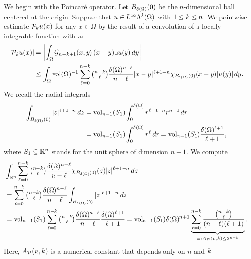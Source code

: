 \documentclass[10pt,a4paper]{article}
\begin{document}
We begin with the Poincar\'e operator. 
Let $B_{{\delta}(\Omega)}(0)$ be the $n$-dimensional ball centered at the origin.
Suppose that $u \in L^{\infty}\Lambda^{k}(\Omega)$ with $1 \leq k \leq n$.
We pointwise estimate ${\mathcal P}_{k} u(x)$ for any $x \in \Omega$ by the result of a convolution of a locally integrable function with $u$:
\begin{align*}
    \left| {\mathcal P}_{k} u(x) \right|
    &=
    \left| 
        \int_{\Omega} {\mathcal G}_{n-k+1}(x,y) \,(x-y)\lrcorner u(y)\,dy
    \right| 
    \\&\leq 
    \int_{\Omega} \operatorname{vol}(\Omega)^{-1} \sum_{\ell=0}^{ n-k }\tbinom{ n-k }{\ell} \frac{ {\delta}(\Omega)^{n-\ell} }{n-\ell} |x-y|^{\ell+1-n} \chi_{B_{{\delta}(\Omega)}(0)}(x-y) |u(y)| \,dy
    .
\end{align*}
We recall the radial integrals 
\begin{align*}
    \int_{B_{{\delta}(\Omega)}(0)} |z|^{\ell+1-n} \,dz
    &
    =
    \operatorname{vol}_{n-1}(S_1) \int_{0}^{{\delta}(\Omega)} r^{\ell+1-n} r^{n-1} \,dr
    \\&
    =
    \operatorname{vol}_{n-1}(S_1) \int_{0}^{{\delta}(\Omega)} r^{\ell} \,dr
    =
    \operatorname{vol}_{n-1}(S_1) \frac{{\delta}(\Omega)^{\ell+1}}{\ell+1}
    ,
\end{align*}
where $S_1 \subseteq {\mathbb R}^{n}$ stands for the unit sphere of dimension $n-1$. 
We compute 
\begin{align}
    &
    \int_{{\mathbb R}^{n}} \sum_{\ell=0}^{n-k} \tbinom{n-k}{\ell} \frac{ {\delta}(\Omega)^{n-\ell} }{n-\ell} \chi_{B_{{\delta}(\Omega)}(0)}(z) |z|^{\ell+1-n} \,dz
    \\&
    =
    \sum_{\ell=0}^{n-k} \tbinom{n-k}{\ell} \frac{ {\delta}(\Omega)^{n-\ell} }{n-\ell} \int_{B_{{\delta}(\Omega)}(0)} |z|^{\ell+1-n} \,dz
    \\&
    =
    \operatorname{vol}_{n-1}(S_1) \sum_{\ell=0}^{n-k} \tbinom{n-k}{\ell} \frac{ {\delta}(\Omega)^{n-\ell} }{n-\ell} \frac{{\delta}(\Omega)^{\ell+1}}{\ell+1}
    =
    \operatorname{vol}_{n-1}(S_1) {\delta}(\Omega)^{n+1} \underbrace{ \sum_{\ell=0}^{n-k} \frac{ \tbinom{n-k}{\ell} }{ (n-\ell)(\ell+1) } }_{ =: A_{{\mathcal P}}(n,k) \leq 2^{n-k}}
    \label{equation:A_Poinc}
    .
\end{align}
Here, $A_{{\mathcal P}}(n,k)$ is a numerical constant that depends only on $n$ and $k$ 
\end{document}
